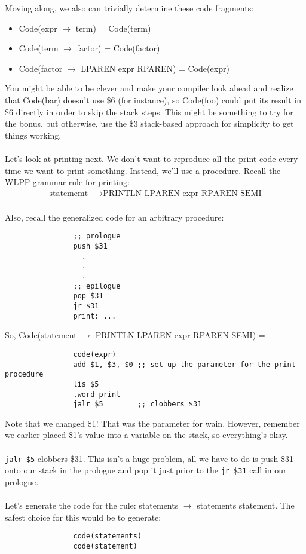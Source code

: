 \documentclass[]{article}
\theoremstyle{definition}
\begin{document}
				Moving along, we also can trivially determine these code fragments:
				\begin{itemize}
					\item Code(expr $\to$ term) = Code(term)
					\item Code(term $\to$ factor) = Code(factor)
					\item Code(factor $\to$ LPAREN expr RPAREN) = Code(expr)
				\end{itemize}

				You might be able to be clever and make your compiler look ahead and realize that Code(bar) doesn't use \$6 (for instance), so Code(foo) could put its result in \$6 directly in order to skip the stack steps. This might be something to try for the bonus, but otherwise, use the \$3 stack-based approach for simplicity to get things working.
				\\ \\
				Let's look at printing next. We don't want to reproduce all the print code every time we want to print something. Instead, we'll use a procedure. Recall the WLPP grammar rule for printing:
				\begin{align*}
					\text{statememt} &\to \text{PRINTLN LPAREN expr RPAREN SEMI} \\
				\end{align*}

				Also, recall the generalized code for an arbitrary procedure:
				\begin{verbatim}
				;; prologue
				push $31
				  .
				  .
				  .
				;; epilogue
				pop $31
				jr $31
				print: ...
				\end{verbatim}

				So, Code(statement $\to$ PRINTLN LPAREN expr RPAREN SEMI) =
				\begin{verbatim}
				code(expr)
				add $1, $3, $0 ;; set up the parameter for the print procedure
				lis $5
				.word print
				jalr $5        ;; clobbers $31
				\end{verbatim}

				Note that we changed \$1! That was the parameter for wain. However, remember we earlier placed \$1's value into a variable on the stack, so everything's okay.
				\\ \\
				\verb+jalr $5+ clobbers \$31. This isn't a huge problem, all we have to do is push \$31 onto our stack in the prologue and pop it just prior to the \verb+jr $31+ call in our prologue.
				\\ \\
				Let's generate the code for the rule: statements $\to$ statements statement. The safest choice for this would be to generate:
				\begin{verbatim}
				code(statements)
				code(statement)
				\end{verbatim}
\end{document}
